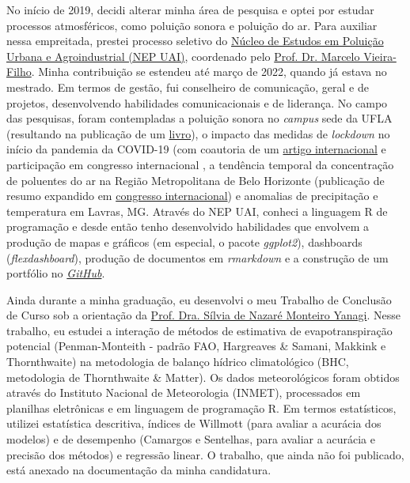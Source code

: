 \documentclass[12pt,a4paper]{article}
\begin{document}
	No início de 2019, decidi alterar minha área de pesquisa e optei por estudar processos atmosféricos, como poluição sonora e poluição do ar. Para auxiliar nessa empreitada, prestei processo seletivo do \href{https://sites.google.com/ufla.br/nepuai?pli=1}{Núcleo de Estudos em Poluição Urbana e Agroindustrial (NEP UAI)}, coordenado pelo \href{http://lattes.cnpq.br/5059318976988668}{Prof. Dr. Marcelo Vieira-Filho}. Minha contribuição se estendeu até março de 2022, quando já estava no mestrado. Em termos de gestão, fui conselheiro de comunicação, geral e de projetos, desenvolvendo habilidades comunicacionais e de liderança. No campo das pesquisas, foram contempladas a poluição sonora no \textit{campus} sede da UFLA (resultando na publicação de um \href{https://sites.google.com/ufla.br/nepuai/publica%C3%A7%C3%B5es/livros?authuser=0}{livro}), o impacto das medidas de \textit{lockdown} no início da pandemia da COVID-19 (com coautoria de um \href{https://link.springer.com/article/10.1007/s11869-020-00959-8}{artigo internacional} e participação em congresso internacional , a tendência temporal da concentração de poluentes do ar na Região Metropolitana de Belo Horizonte (publicação de resumo expandido em \href{https://www.inicepg.univap.br/cd/INIC_2021/anais/arquivos/RE_0771_0575_01.pdf}{congresso internacional}) e anomalias de precipitação e temperatura em Lavras, MG. Através do NEP UAI, conheci a linguagem R de programação e desde então tenho desenvolvido habilidades que envolvem a produção de mapas e gráficos (em especial, o pacote \textit{ggplot2}), dashboards (\textit{flexdashboard}), produção de documentos em \textit{rmarkdown} e a construção de um portfólio no \href{https://arthurboari.github.io/arthurboari/}{\textit{GitHub}}.
	
	Ainda durante a minha graduação, eu desenvolvi o meu Trabalho de Conclusão de Curso sob a orientação da \href{http://lattes.cnpq.br/3943657653311716}{Prof. Dra. Sílvia de Nazaré Monteiro Yanagi}. Nesse trabalho, eu estudei a interação de métodos de estimativa de evapotranspiração potencial (Penman-Monteith - padrão FAO, Hargreaves \& Samani, Makkink e Thornthwaite) na metodologia de balanço hídrico climatológico (BHC, metodologia de Thornthwaite \& Matter). Os dados meteorológicos foram obtidos através do Instituto Nacional de Meteorologia (INMET), processados em planilhas eletrônicas e em linguagem de programação R. Em termos estatísticos, utilizei estatística descritiva, índices de Willmott (para avaliar a acurácia dos modelos) e de desempenho (Camargos e Sentelhas, para avaliar a acurácia e precisão dos métodos) e regressão linear. O trabalho, que ainda não foi publicado, está anexado na documentação da minha candidatura.
	
\end{document}
